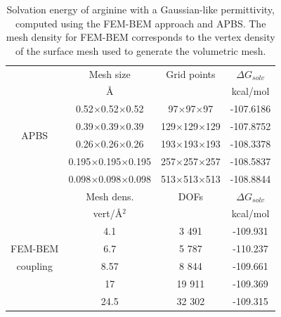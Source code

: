 \begin{table}
\centering
\begin{tabular}{c|c|c|c}
&Mesh size  & Grid points & $\Delta G_{solv}$\\
&\AA       & &  kcal/mol \\
\hline
\multirow{4}{*}{APBS}& 0.52$\times$0.52$\times$0.52 & 97$\times$97$\times$97 & -107.6186 \\ 
& 0.39$\times$0.39$\times$0.39 & 129$\times$129$\times$129 & -107.8752\\ 
&0.26$\times$0.26$\times$0.26 & 193$\times$193$\times$193& -108.3378\\ 
&0.195$\times$0.195$\times$0.195 & 257$\times$257$\times$257& -108.5837\\ 
&0.098$\times$0.098$\times$0.098 & 513$\times$513$\times$513& -108.8844\\ 
\hline
&Mesh dens. & DOFs & $\Delta G_{solv}$\\
&vert/\AA$^2$   &  &  kcal/mol \\
\hline
    & 4.1 & 3 491 & -109.931 \\
FEM-BEM    & 6.7  & 5 787 & -110.237 \\
coupling    & 8.57  & 8 844 & -109.661 \\
    & 17 & 19 911 & -109.369 \\
    & 24.5 & 32 302 & -109.315 \\
\hline
\end{tabular}
\caption{Solvation energy of arginine with a Gaussian-like permittivity, computed using the FEM-BEM approach and APBS. The mesh density for FEM-BEM corresponds to the vertex density of the surface mesh used to generate the volumetric mesh.}
\label{table:arg_variable}
\end{table}

